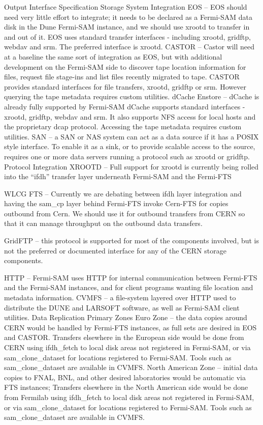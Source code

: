Output Interface Specification
Storage System Integration
EOS -- EOS should need very little effort to integrate; it needs to be declared as  a Fermi-SAM data disk in the Dune Fermi-SAM instance, and we should use xrootd to transfer in and out of it.
EOS uses standard transfer interfaces - including xrootd, gridftp, webdav and srm. The preferred interface is xrootd.
CASTOR -- Castor will need at a baseline the same sort of integration as EOS, but with additional development on the Fermi-SAM side to discover tape location information for files, request file stage-ins and list files recently migrated to tape.
CASTOR provides standard interfaces for file transfers, xrootd, gridftp or srm. However querying the tape metadata requires custom utilities.
dCache Enstore -- dCache is already fully supported by Fermi-SAM
dCache supports standard interfaces - xrootd, gridftp, webdav and srm. It also supports NFS access for local hosts and the proprietary dcap protocol. Accessing the tape metadata requires custom utilities. 
SAN -- a SAN or NAS system can act as a data source if it has a POSIX style interface. To enable it as a sink, or to provide scalable access to the source, requires one or more data servers running a protocol such as xrootd or gridftp.
Protocol Integration
XROOTD -- Full support for xrootd is currently being rolled into the ``ifdh'' transfer layer underneath Fermi-SAM and the Fermi-FTS

WLCG FTS -- Currently we are debating between ifdh layer integration and having the sam_cp layer behind Fermi-FTS invoke Cern-FTS for copies outbound from Cern.  We should use it for outbound transfers from CERN so that it can manage throughput on the outbound data transfers.

GridFTP -- this protocol is supported for most of the components involved, but is not the preferred or documented interface for any of the CERN storage components.

HTTP -- Fermi-SAM uses HTTP for internal communication between Fermi-FTS and the Fermi-SAM instances, and for client programs wanting file location and metadata information.
CVMFS -- a file-system layered over HTTP used to distribute the DUNE and LARSOFT software, as well as Fermi-SAM client utilities. 
Data Replication
Primary Zones
Euro Zone -- the data copies around CERN would be handled by Fermi-FTS instances, as full sets are desired in  EOS and CASTOR.   Transfers elsewhere in the European side would be done from CERN using ifdh_fetch to local disk areas not registered in Fermi-SAM, or via sam_clone_dataset for locations registered to Fermi-SAM.  Tools such as sam_clone_dataset are available in CVMFS.
North American Zone -- initial data copies to FNAL, BNL, and other desired laboratories would be automatic via FTS instances; Transfers elsewhere in the North American side would be done from Fermilab  using ifdh_fetch to local disk areas not registered in Fermi-SAM, or via sam_clone_dataset for locations registered to Fermi-SAM. Tools such as sam_clone_dataset are available in CVMFS.


